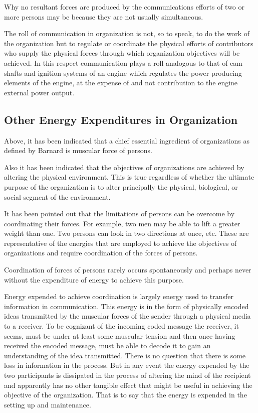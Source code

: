 Why no resultant forces are produced by the communications efforts of two or more persons may be because they are not usually simultaneous.

The roll of communication in organization is not, so to speak, to do the work of the organization but to regulate or coordinate the physical efforts of contributors who supply the physical forces through which organization objectives will be achieved. In this respect communication plays a roll analogous to that of cam shafts and ignition systems of an engine which regulates the power producing elements of the engine, at the expense of and not contribution to the engine external power output.

\subsection{Other Energy Expenditures in Organization}

Above, it has been indicated that a chief essential ingredient of organizations as defined by Barnard is muscular force of persons.

Also it has been indicated that the objectives of organizations are achieved by altering the physical environment. This is true regardless of whether the ultimate purpose of the organization is to alter principally the physical, biological, or social segment of the environment.

It has been pointed out that the limitations of persons can be overcome by coordinating their forces. For example, two men may be able to lift a greater weight than one. Two persons can look in two directions at once, etc. These are representative of the energies that are employed to achieve the objectives of organizations and require coordination of the forces of persons.

Coordination of forces of persons rarely occurs spontaneously and perhaps never without the expenditure of energy to achieve this purpose.

Energy expended to achieve coordination is largely energy used to transfer information in communication. This energy is in the form of physically encoded ideas transmitted by the muscular forces of the sender through a physical media to a receiver. To be cognizant of the incoming coded message the receiver, it seems, must be under at least some muscular tension and then once having received the encoded message, must be able to decode it to gain an understanding of the idea transmitted. There is no question that there is some loss in information in the process. But in any event the energy expended by the two participants is dissipated in the process of altering the mind of the recipient and apparently has no other tangible effect that might be useful in achieving the objective of the organization. That is to say that the energy is expended in the setting up and maintenance.

